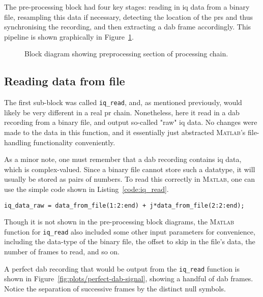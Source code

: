 \documentclass[class=report,11pt,crop=false]{standalone}
\begin{document}
The pre-processing block had four key stages: reading in \gls{iq} data from a binary file, resampling this data if necessary, detecting the location of the \gls{prs} and thus synchronising the recording, and then extracting a \gls{dab} frame accordingly. This pipeline is shown graphically in Figure~\ref{fig:BD_Preprocess_All}.

\begin{figure}[htbp]
    \centering
    \captionsetup{type=figure}
    \def\svgwidth{\linewidth}
    { %
        }
    \caption{Block diagram showing preprocessing section of processing chain.}
    \label{fig:BD_Preprocess_All}
\end{figure}

\subsection{Reading  data from file \label{subsect:dab-proc_iq-read}}
The first sub-block was called \texttt{iq\_read}, and, as mentioned previously, would likely be very different in a real \gls{pr} chain. Nonetheless, here it read in a \gls{dab} recording from a binary file, and output so-called "raw" \gls{iq} data. No changes were made to the data in this function, and it essentially just abstracted \textsc{Matlab}'s file-handling functionality conveniently.

As a minor note, one must remember that a \gls{dab} recording contains \gls{iq} data, which is complex-valued. Since a binary file cannot store such a datatype, it will usually be stored as pairs of numbers. To read this correctly in \textsc{Matlab}, one can use the simple code shown in Listing~\ref{code:iq_read}.

\begin{lstlisting}[caption={\textsc{Matlab} code for creating a complex data array with the values read from a binary file.},label={code:iq_read}]
iq_data_raw = data_from_file(1:2:end) + j*data_from_file(2:2:end);
\end{lstlisting}

Though it is not shown in the pre-processing block diagrams, the \textsc{Matlab} function for \texttt{iq\_read} also included some other input parameters for convenience, including the data-type of the binary file, the offset to skip in the file's data, the number of frames to read, and so on.

A perfect \gls{dab} recording that would be output from the \texttt{iq\_read} function is shown in Figure~\ref{fig:plots/perfect-dab-signal}, showing a handful of \gls{dab} frames. Notice the separation of successive frames by the distinct null symbols.
\end{document}

